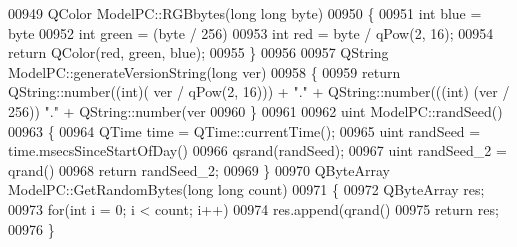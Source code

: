 \begin{DoxyCode}
{00949 QColor ModelPC::RGBbytes(\textcolor{keywordtype}{long} \textcolor{keywordtype}{long} byte)
00950 \{
00951     \textcolor{keywordtype}{int} blue = byte %
00952     \textcolor{keywordtype}{int} green = (byte / 256) %
00953     \textcolor{keywordtype}{int} red = byte / qPow(2, 16);
00954     \textcolor{keywordflow}{return} QColor(red, green, blue);
00955 \}
00956 
00957 QString ModelPC::generateVersionString(\textcolor{keywordtype}{long} ver)
00958 \{
00959     \textcolor{keywordflow}{return} QString::number((\textcolor{keywordtype}{int})( ver / qPow(2, 16))) + \textcolor{stringliteral}{"."} + QString::number(((\textcolor{keywordtype}{int}) (ver / 256)) %
      "."} + QString::number(ver %
00960 \}
00961 
00962 uint ModelPC::randSeed()
00963 \{
00964     QTime time = QTime::currentTime();
00965     uint randSeed = time.msecsSinceStartOfDay() %
00966     qsrand(randSeed);
00967     uint randSeed\_2 = qrand() %
00968     \textcolor{keywordflow}{return} randSeed\_2;
00969 \}
00970 QByteArray ModelPC::GetRandomBytes(\textcolor{keywordtype}{long} \textcolor{keywordtype}{long} count)
00971 \{
00972     QByteArray res;
00973     \textcolor{keywordflow}{for}(\textcolor{keywordtype}{int} i = 0; i < count; i++)
00974        res.append(qrand() %
00975     \textcolor{keywordflow}{return} res;
00976 \}
\end{DoxyCode}
